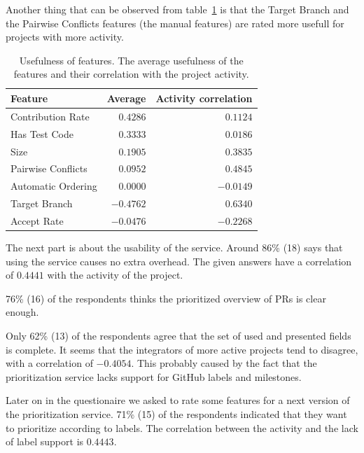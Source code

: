 \documentclass[conference]{IEEEtran}
\begin{document}
Another thing that can be observed from table~\ref{tab:usefulness} is that the Target Branch and the Pairwise Conflicts features (the manual features) are rated more usefull for projects with more activity.

\begin{table}
  \centering
  \begin{tabular}{lrr}
    \hline
    \textbf{Feature} & \textbf{Average} & \textbf{Activity correlation} \\
    \hline
    Contribution Rate  &  $0.4286$ &  $0.1124$ \\
    Has Test Code      &  $0.3333$ &  $0.0186$ \\
    Size               &  $0.1905$ &  $0.3835$ \\
    Pairwise Conflicts &  $0.0952$ &  $0.4845$ \\
    Automatic Ordering &  $0.0000$ & $-0.0149$ \\
    Target Branch      & $-0.4762$ &  $0.6340$ \\
    Accept Rate        & $-0.0476$ & $-0.2268$ \\
    \hline
  \end{tabular}
  \caption[Usefulness of features]{Usefulness of features. The average usefulness of the features and their correlation with the project activity.}
  \label{tab:usefulness}
\end{table}

The next part is about the usability of the service.
Around 86\% (18) says that using the service causes no extra overhead.
The given answers have a correlation of $0.4441$ with the activity of the project.

76\% (16) of the respondents thinks the prioritized overview of PRs is clear enough.

Only 62\% (13) of the respondents agree that the set of used and presented fields is complete.
It seems that the integrators of more active projects tend to disagree, with a correlation of $-0.4054$.
This probably caused by the fact that the prioritization service lacks support for GitHub labels and milestones.

Later on in the questionaire we asked to rate some features for a next version of the prioritization service.
71\% (15) of the respondents indicated that they want to prioritize according to labels.
The correlation between the activity and the lack of label support is $0.4443$.
\end{document}
